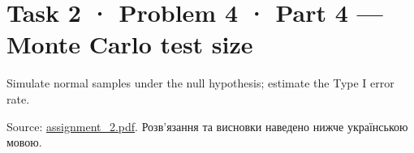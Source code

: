 \documentclass[11pt]{article}
\title{}
\begin{document}
    
    \maketitle
    
    

    
    \section{Task 2 · Problem 4 · Part 4 --- Monte Carlo test
size}\label{task-2-problem-4-part-4-monte-carlo-test-size}

Simulate normal samples under the null hypothesis; estimate the Type I
error rate.

Source: \href{../../../input/assignment_2.pdf}{assignment\_2.pdf}. Розв'язання
та висновки наведено нижче українською мовою.
\end{document}
